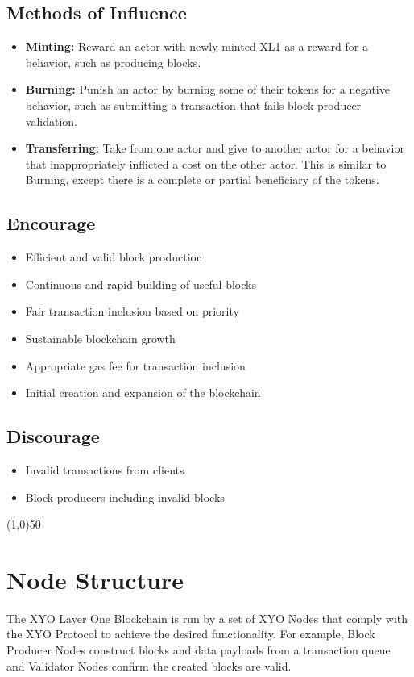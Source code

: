 \documentclass{article}
\begin{document}
\subsection{Methods of Influence}
\begin{itemize}
    \item \textbf{Minting:} Reward an actor with newly minted XL1 as a reward for a behavior, such as producing blocks. 
    \item \textbf{Burning:} Punish an actor by burning some of their tokens for a negative behavior, such as submitting a transaction that fails block producer validation. 
    \item \textbf{Transferring:} Take from one actor and give to another actor for a behavior that inappropriately inflicted a cost on the other actor. This is similar to Burning, except there is a complete or partial beneficiary of the tokens.
\end{itemize}

\subsection{Encourage}
\begin{itemize}
    \item Efficient and valid block production
    \item Continuous and rapid building of useful blocks
    \item Fair transaction inclusion based on priority
    \item Sustainable blockchain growth
    \item Appropriate gas fee for transaction inclusion
    \item Initial creation and expansion of the blockchain
\end{itemize}

\subsection{Discourage}
\begin{itemize}
    \item Invalid transactions from clients
    \item Block producers including invalid blocks
\end{itemize}

\begin{center}
    \line(1,0){50}
\end{center}

\section{Node Structure}
The XYO Layer One Blockchain is run by a set of XYO Nodes that comply with the XYO Protocol to achieve the desired functionality. For example, Block Producer Nodes construct blocks and data payloads from a transaction queue and Validator Nodes confirm the created blocks are valid. 
\end{document}
